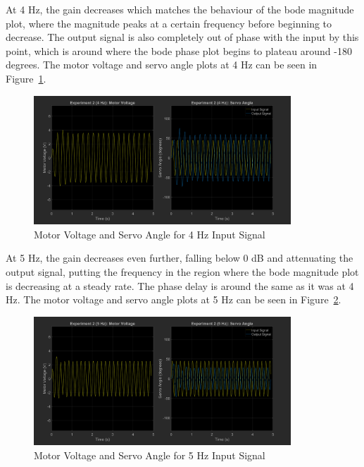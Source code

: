 \documentclass[12pt]{article}
\begin{document}
At 4 Hz, the gain decreases which matches the behaviour of the bode magnitude plot, where the magnitude peaks at a certain frequency before beginning to decrease. The output signal is also completely out of phase with the input by this point, which is around where the bode phase plot begins to plateau around -180 degrees. The motor voltage and servo angle plots at 4 Hz can be seen in Figure~\ref{fig:exp2_4}.
\begin{figure}[h!]
    \centering
    \includegraphics[width=0.86\textwidth]{exp2_4}
    \caption{\label{fig:exp2_4}Motor Voltage and Servo Angle for 4 Hz Input Signal}
\end{figure}

At 5 Hz, the gain decreases even further, falling below 0 dB and attenuating the output signal, putting the frequency in the region where the bode magnitude plot is decreasing at a steady rate. The phase delay is around the same as it was at 4 Hz. The motor voltage and servo angle plots at 5 Hz can be seen in Figure~\ref{fig:exp2_5}.
\begin{figure}[h!]
    \centering
    \includegraphics[width=0.86\textwidth]{exp2_5}
    \caption{\label{fig:exp2_5}Motor Voltage and Servo Angle for 5 Hz Input Signal}
\end{figure}
\end{document}
